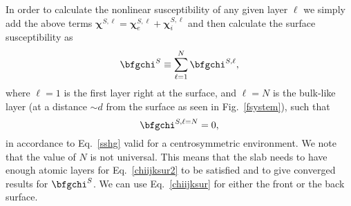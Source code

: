 \documentclass[floatfix,prb,aps,superscriptaddress,11pt,preprint,letterpaper]{revtex4}
\begin{document}
In order to calculate the nonlinear susceptibility of any given layer 
$\ell$ we simply add the above terms $\boldsymbol{\chi}^{S,\ell}=
\boldsymbol{\chi}_e^{S,\ell}+\boldsymbol{\chi}_i^{S,\ell}$ and 
then calculate the surface susceptibility as 
\begin{equation}\label{chiijksur}
\bfgchi^S\equiv \sum_{\ell=1}^{N}\bfgchi^{S,\ell},
\end{equation} 
where $\ell=1$ is the first layer right at the surface, 
and $\ell=N$ is the bulk-like layer (at a distance $\sim d$ from the
surface  as seen in
Fig.~\ref{fsystem}), such that 
\begin{equation}\label{chiijksur2}
\bfgchi^{S,\ell=N}=0,
\end{equation}
in accordance to Eq.~\eqref{sshg} valid for a centrosymmetric environment. 
We note that the value of
$N$ is not universal.
This means that the slab needs to have enough atomic layers for 
Eq.~\eqref{chiijksur2} 
to be satisfied and to give converged results for $\bfgchi^S$. 
We can use Eq.~\eqref{chiijksur} for
either the front or the back surface.
\end{document}
